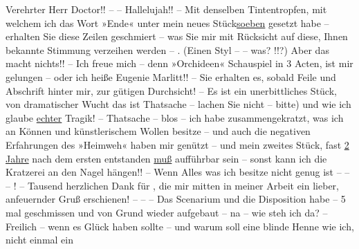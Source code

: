 \pstart{}Verehrter Herr Doctor!! – –\pend\vspace{0.5em}
\pstart
           Hallelujah!! – Mit denselben Tintentropfen, mit welchem ich das Wort »Ende« unter
               mein neues Stück\uline{soeben} gesetzt habe – erhalten Sie diese Zeilen
               geschmiert – was Sie mir mit Rücksicht auf diese, Ihnen bekannte Stimmung verzeihen
               werden – . (Einen Styl – – \introOben{}was?\introOben{} !!?) Aber das macht nichts!!
               – Ich freue mich – denn »Orchideen« Schauspiel
               in 3 Acten, ist mir gelungen – oder ich heiße Eugenie Marlitt!! – Sie erhalten es, sobald Feile und Abschrift {\pb}hinter mir, zur gütigen Durchsicht! – Es ist ein unerbittliches Stück, von dramatischer Wucht das ist
               Thatsache – lachen Sie nicht – bitte) und wie ich glaube \uline{echter} Tragik! – Thatsache – blos – ich habe  zusammengekratzt, was ich an Können und künstlerischem Wollen besitze
               – und auch die negativen Erfahrungen des »Heimweh« haben mir genützt – und mein zweites Stück, fast \uline{2
                  Jahre} nach dem ersten
               entstanden \uline{muß} aufführbar sein – sonst kann ich die
               Kratzerei an den Nagel hängen!! – Wenn Alles was ich besitze nicht genug ist – – – !
               – Tausend herzlichen Dank für \label{K_L03709-1v}\label{K_L03709-1}, die mir mitten in meiner Arbeit ein lieber, anfeuernder Gruß
                  {\pb}erschienen! – – – Das Scenarium und die Disposition habe – 5 mal
               geschmissen und von Grund wieder aufgebaut – na – wie steh ich da? – Freilich – wenn
               es Glück haben sollte – und warum soll eine blinde Henne wie ich, nicht einmal ein

